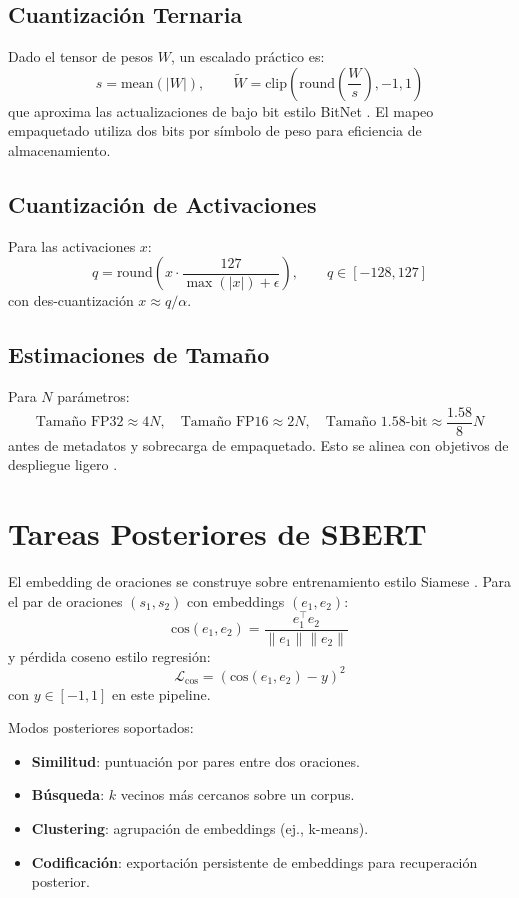 \documentclass[11pt,a4paper]{article}
\begin{document}
\subsection{Cuantización Ternaria}
Dado el tensor de pesos $W$, un escalado práctico es:
\[
s=\text{mean}(|W|),\qquad
\tilde{W}=\text{clip}\left(\text{round}\left(\frac{W}{s}\right),-1,1\right)
\]
que aproxima las actualizaciones de bajo bit estilo BitNet \citep{wang_bitnet_2023}. El mapeo empaquetado utiliza dos bits por símbolo de peso para eficiencia de almacenamiento.

\subsection{Cuantización de Activaciones}
Para las activaciones $x$:
\[
q=\text{round}\left(x\cdot\frac{127}{\max(|x|)+\epsilon}\right),\qquad q\in[-128,127]
\]
con des-cuantización $x\approx q/\alpha$.

\subsection{Estimaciones de Tamaño}
Para $N$ parámetros:
\[
\text{Tamaño FP32}\approx 4N,\quad \text{Tamaño FP16}\approx 2N,\quad \text{Tamaño 1.58-bit}\approx \frac{1.58}{8}N
\]
antes de metadatos y sobrecarga de empaquetado. Esto se alinea con objetivos de despliegue ligero \citep{samson_lightweight_2026,bravin_embbert_2026}.

\section{Tareas Posteriores de SBERT}
\label{sec:sbert}

El embedding de oraciones se construye sobre entrenamiento estilo Siamese \citep{reimers_sentence-bert_2019}. Para el par de oraciones $(s_1,s_2)$ con embeddings $(e_1,e_2)$:
\[
\text{cos}(e_1,e_2)=\frac{e_1^\top e_2}{\|e_1\|\|e_2\|}
\]
y pérdida coseno estilo regresión:
\[
\mathcal{L}_{\text{cos}}=\left(\text{cos}(e_1,e_2)-y\right)^2
\]
con $y\in[-1,1]$ en este pipeline.

Modos posteriores soportados:
\begin{itemize}[leftmargin=*]
    \item \textbf{Similitud}: puntuación por pares entre dos oraciones.
    \item \textbf{Búsqueda}: $k$ vecinos más cercanos sobre un corpus.
    \item \textbf{Clustering}: agrupación de embeddings (ej., k-means).
    \item \textbf{Codificación}: exportación persistente de embeddings para recuperación posterior.
\end{itemize}
\end{document}
